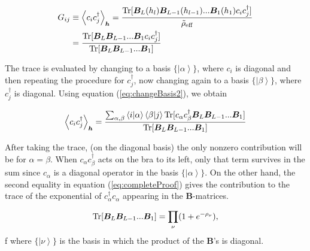 \begin{equation}
\begin{split}
G_{ij}&\equiv \left\langle c_i c_j^\dagger \right\rangle_{\bm h} = \frac{\operatorname{Tr}[\bm B_L(h_l) \bm B_{L-1}(h_{l-1}) ... \bm B_1 (h_1) c_i c_j^\dagger]}{\tilde{\rho}_{\text{eff}}} \\
&= \frac{\operatorname{Tr}[\bm B_L \bm B_{L-1} ... \bm B_1 c_i c_j^\dagger] }{\operatorname{Tr}[\bm B_L \bm B_{L-1} ... \bm B_1] }
\end{split}
\end{equation}

The trace is evaluated by changing to a basis $\{\left|\alpha\right\rangle\}$, where $c_i$ is diagonal and then repeating the procedure for $c_j^\dagger$, now changing again to a basis $\{\left|\beta\right\rangle\}$, where $c_j^\dagger$ is diagonal. Using equation (\ref{eq:changeBasis2}), we obtain

\begin{equation}
\left\langle c_i c_j^\dagger \right\rangle_{\bm h} = \frac{\sum_{\alpha, \beta} \left\langle i | \alpha \right\rangle \left\langle \beta | j \right\rangle \operatorname{Tr}[c_{\alpha} c_\beta^\dagger \bm B_L \bm B_{L-1} ... \bm B_1] }{\operatorname{Tr} [\bm B_L \bm B_{L-1} ... \bm B_1] } 
\end{equation}

After taking the trace, (on the diagonal basis) the only nonzero contribution will be for $\alpha = \beta$. When $c_\alpha c_\beta^\dagger$ acts on the bra to its left, only that term survives in the sum since $c_\alpha$ is a diagonal operator in the basis $\{\left|\alpha\right\rangle\}$. On the other hand, the second equality in equation (\ref{eq:completeProof}) gives the contribution to the trace of the exponential of $c_\alpha^\dagger c_\alpha$ appearing in the $\bm B$-matrices. 

\begin{equation}\label{eq:traceExp}
\operatorname{Tr} [\bm B_L \bm B_{L-1} ... \bm B_1] = \prod_{\nu} ( 1 + e^{-\rho_\nu} ) ,
\end{equation}f
where $\{\left|\nu\right\rangle\}$ is the basis in which the product of the $\bm B$'s is diagonal.

